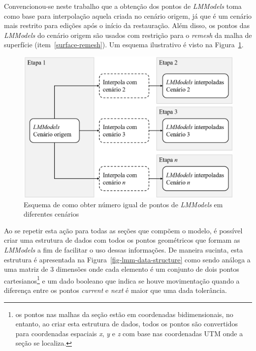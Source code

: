 Convencionou-se neste trabalho que a obtenção dos pontos de \textit{LMModels} toma como base para interpolação aquela criada no cenário origem, já que é um cenário mais restrito para edições após o início da restauração. Além disso, os pontos das \emph{LMModels} do cenário origem são usados com restrição para o \emph{remesh} da malha de superfície (item~\ref{surface-remesh}). Um esquema ilustrativo é visto na Figura~\ref{fig-lmm-interp2}.

\begin{figure} [H]
  \begin{center}
    \includegraphics[width=350pt]{images/fig-lmm-interp2}
    \caption{Esquema de como obter número igual de pontos de \textit{LMModels} em diferentes cenários}\label{fig-lmm-interp2}
  \end{center}
\end{figure}

Ao se repetir esta ação para todas as seções que compõem o modelo, é possível criar uma estrutura de dados com todos os pontos geométricos que formam as \textit{LMModels} a fim de facilitar o uso dessas informações. De maneira sucinta, esta estrutura é apresentada na Figura~\ref{fig-lmm-data-structure} como sendo análoga a uma matriz de 3 dimensões onde cada elemento é um conjunto de dois pontos cartesianos\footnote{os pontos nas malhas da seção estão em coordenadas bidimensionais, no entanto, ao criar esta estrutura de dados, todos os pontos são convertidos para coordenadas espaciais \textit{x}, \textit{y} e \textit{z} com base nas coordenadas UTM onde a seção se localiza.} e um dado booleano que indica se houve movimentação quando a diferença entre os pontos \textit{current} e \textit{next} é maior que uma dada tolerância.

